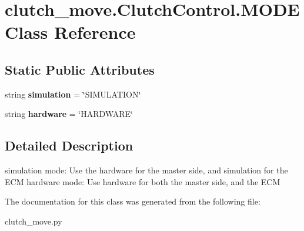\hypertarget{classclutch__move_1_1ClutchControl_1_1MODE}{\section{clutch\-\_\-move.\-Clutch\-Control.\-M\-O\-D\-E Class Reference}
\label{classclutch__move_1_1ClutchControl_1_1MODE}
}
\subsection*{Static Public Attributes}
\begin{DoxyCompactItemize}
\item 
\hypertarget{classclutch__move_1_1ClutchControl_1_1MODE_a06638f80bf2cf99369cdfaba20742ed1}{string {\bfseries simulation} = \char`\"{}S\-I\-M\-U\-L\-A\-T\-I\-O\-N\char`\"{}}\label{classclutch__move_1_1ClutchControl_1_1MODE_a06638f80bf2cf99369cdfaba20742ed1}

\item 
\hypertarget{classclutch__move_1_1ClutchControl_1_1MODE_a104ee1fe0def55588ea6a0e8900cd878}{string {\bfseries hardware} = \char`\"{}H\-A\-R\-D\-W\-A\-R\-E\char`\"{}}\label{classclutch__move_1_1ClutchControl_1_1MODE_a104ee1fe0def55588ea6a0e8900cd878}

\end{DoxyCompactItemize}


\subsection{Detailed Description}
\begin{DoxyVerb}    simulation mode: Use the hardware for the master side, 
            and simulation for the ECM
    hardware mode: Use hardware for both the master side,
            and the ECM
\end{DoxyVerb}
 

The documentation for this class was generated from the following file\-:\begin{DoxyCompactItemize}
\item 
clutch\-\_\-move.\-py\end{DoxyCompactItemize}
